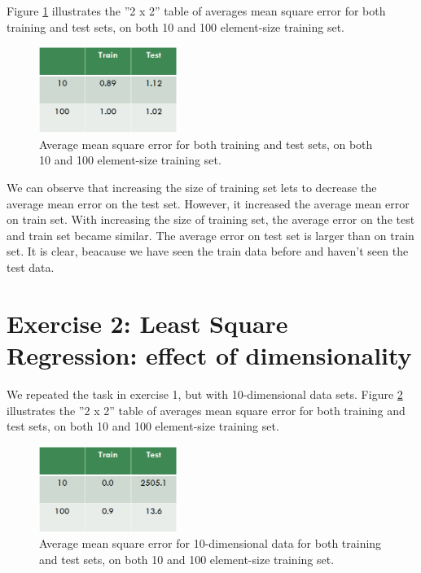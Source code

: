 \documentclass{article} %
\begin{document}
Figure \ref{fig:resultMatrix1} illustrates the ''2 x 2'' table of averages mean square error for both training and test sets, on both 10 and 100 element-size training set.
\begin{figure}[h]
\begin{center}
\includegraphics[width=0.4\textwidth]{resultsMatrix}
\end{center}
\caption{Average mean square error for both training and test sets, on both 10 and 100 element-size training set.}
\label{fig:resultMatrix1}
\end{figure}

We can observe that increasing the size of training set lets to decrease the average mean error on the test set.
However, it increased the average mean error on train set.
With increasing the size of training set, the average error on the test and train set became similar.
The average error on test set is larger than on train set. It is clear, beacause we have seen the train data before and haven't seen the test data.
\section{Exercise 2: Least Square Regression: effect of dimensionality}
We repeated the task in exercise 1, but with 10-dimensional data sets. Figure \ref{fig:resultMatrix2} illustrates the ''2 x 2'' table of averages mean square error for both training and test sets, on both 10 and 100 element-size training set.
\begin{figure}[h]
\begin{center}
\includegraphics[width=0.4\textwidth]{resultsMatrix2}
\end{center}
\caption{Average mean square error for 10-dimensional data for both training and test sets, on both 10 and 100 element-size training set.}
\label{fig:resultMatrix2}
\end{figure}
\end{document}
